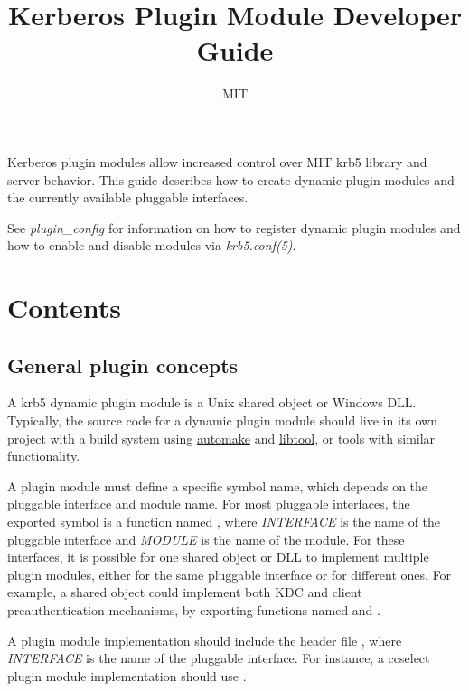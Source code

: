 \documentclass[letterpaper,10pt,english]{sphinxmanual}
\title{Kerberos Plugin Module Developer Guide}
\date{ }
\author{MIT}
\begin{document}
\maketitle
\tableofcontents
{}\label{plugindev/index::doc}


Kerberos plugin modules allow increased control over MIT krb5 library
and server behavior.  This guide describes how to create dynamic
plugin modules and the currently available pluggable interfaces.

See \emph{plugin\_config} for information on how to register dynamic
plugin modules and how to enable and disable modules via
\emph{krb5.conf(5)}.


\chapter{Contents}
\label{plugindev/index:for-plugin-module-developers}\label{plugindev/index:contents}

\section{General plugin concepts}
\label{plugindev/general:general-plugin-concepts}\label{plugindev/general::doc}
A krb5 dynamic plugin module is a Unix shared object or Windows DLL.
Typically, the source code for a dynamic plugin module should live in
its own project with a build system using \href{http://www.gnu.org/software/automake/}{automake} and \href{http://www.gnu.org/software/libtool/}{libtool}, or
tools with similar functionality.

A plugin module must define a specific symbol name, which depends on
the pluggable interface and module name.  For most pluggable
interfaces, the exported symbol is a function named
, where \emph{INTERFACE} is the name of the
pluggable interface and \emph{MODULE} is the name of the module.  For these
interfaces, it is possible for one shared object or DLL to implement
multiple plugin modules, either for the same pluggable interface or
for different ones.  For example, a shared object could implement both
KDC and client preauthentication mechanisms, by exporting functions
named  and .

A plugin module implementation should include the header file
, where \emph{INTERFACE} is the name of the
pluggable interface.  For instance, a ccselect plugin module
implementation should use .
\end{document}
